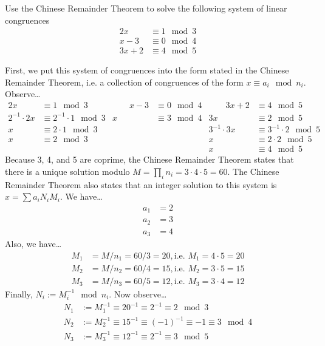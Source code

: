 \documentclass[11pt,letterpaper]{article}
\begin{document}
\newpage



 Use the Chinese Remainder Theorem to solve the following system of linear congruences
	\[
	\begin{aligned}
	2x &\equiv 1 \mod 3 \\
	x - 3&\equiv 0 \mod 4 \\
	3x + 2&\equiv 4 \mod 5
	\end{aligned}
	\] \pspace

\sol First, we put this system of congruences into the form stated in the Chinese Remainder Theorem, i.e. a collection of congruences of the form $x \equiv a_i \mod n_i$. Observe\dots
	\[
	\begin{aligned}
	2x&\equiv 1 \mod 3 &\qquad x - 3&\equiv 0 \mod 4 &\qquad 3x + 2&\equiv 4 \mod 5 \\
	2^{-1} \cdot 2x&\equiv 2^{-1} \cdot 1 \mod 3 & x&\equiv 3 \mod 4 & 3x&\equiv 2 \mod 5 \\
	x&\equiv 2 \cdot 1 \mod 3 & & & 3^{-1} \cdot 3x&\equiv 3^{-1} \cdot 2 \mod 5 \\
	x&\equiv 2 \mod 3 & & & x&\equiv 2 \cdot 2 \mod 5 \\
	& & & & x&\equiv 4 \mod 5
	\end{aligned}
	\]
Because 3, 4, and 5 are coprime, the Chinese Remainder Theorem states that there is a unique solution modulo $M= \prod_i n_i= 3 \cdot 4 \cdot 5= 60$. The Chinese Remainder Theorem also states that an integer solution to this system is $x= \sum a_i N_i M_i$. We have\dots
	\[
	\begin{aligned}
	a_1&= 2 \\
	a_2&= 3 \\
	a_3&= 4 
	\end{aligned}
	\]
Also, we have\dots
	\[
	\begin{aligned}
	M_1&= M/n_1= 60/3= 20, \text{i.e. } M_1= 4 \cdot 5= 20 \\
	M_2&= M/n_2= 60/4= 15, \text{i.e. } M_2= 3 \cdot 5= 15 \\
	M_3&= M/n_3= 60/5= 12, \text{i.e. } M_3= 3 \cdot 4= 12
	\end{aligned}
	\]
Finally, $N_i:= M_i^{-1} \mod n_i$. Now observe\dots
	\[
	\begin{aligned}
	N_1&:= M_1^{-1} \equiv 20^{-1} \equiv 2^{-1} \equiv 2 \mod 3 \\
	N_2&:= M_2^{-1} \equiv 15^{-1} \equiv (-1)^{-1} \equiv -1 \equiv 3 \mod 4 \\
	N_3&:= M_3^{-1} \equiv 12^{-1} \equiv 2^{-1} \equiv 3 \mod 5
	\end{aligned}
	\]
\end{document}
